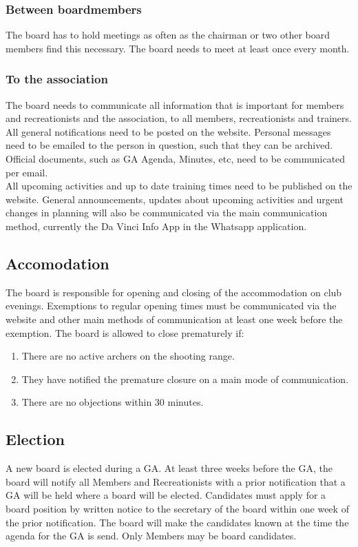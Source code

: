 \documentclass[a4paper]{article}
\begin{document}
\subsubsection{Between boardmembers}
The board has to hold meetings as often as the chairman or two other board members find this necessary. The board needs to meet at least once every month.
\subsubsection{To the association}
The board needs to communicate all information that is important for members and recreationists and the association, to all members, recreationists and trainers. All general notifications need to be posted on the website. Personal messages need to be emailed to the person in question, such that they can be archived. Official documents, such as GA Agenda, Minutes, etc, need to be communicated per email. \\
 
All upcoming activities and up to date training times need to be published on the website. 
General announcements, updates about upcoming activities and urgent changes in planning will also be communicated via the main communication method, currently the Da Vinci Info App in the Whatsapp application.

\subsection{Accomodation}
The board is responsible for opening and closing of the accommodation on club evenings. Exemptions to regular opening times must be communicated via the website and other main methods of communication at least one week before the exemption. The board is allowed to close prematurely if: \\

\begin{enumerate}
\item There are no active archers on the shooting range.
\item They have notified the premature closure on a main mode of communication.
\item There are no objections within 30 minutes.
\end{enumerate}

\subsection{Election}
A new board is elected during a GA. At least three weeks before the GA, the board will notify all Members and Recreationists with a prior notification that a GA will be held where a board will be elected. Candidates must apply for a board position by written notice to the secretary of the board within one week of the prior notification. The board will make the candidates known at the time the agenda for the GA is send. Only Members may be board candidates. \\
\end{document}
